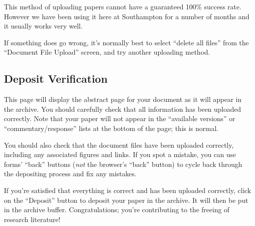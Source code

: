 This method of uploading papers cannot have a guaranteed 100\% success rate. However we have been using it here at Southampton for a number of months and it usually works very well.

If something does go wrong, it's normally best to select ``delete all files'' from the ``Document File Upload'' screen, and try another uploading method.


\subsection{Deposit Verification}

This page will display the abstract page for your document as it will appear in the archive. You should carefully check that all information has been uploaded correctly. Note that your paper will not appear in the ``available versions'' or ``commentary/response'' lists at the bottom of the page; this is normal.

You should also check that the document files have been uploaded correctly, including any associated figures and links. If you spot a mistake, you can use forms' ``back'' buttons (\emph{not} the browser's ``back'' button) to cycle back through the depositing process and fix any mistakes.

If you're satisfied that everything is correct and has been uploaded correctly, click on the ``Deposit'' button to deposit your paper in the archive. It will then be put in the archive buffer. Congratulations; you're contributing to the freeing of research literature!
